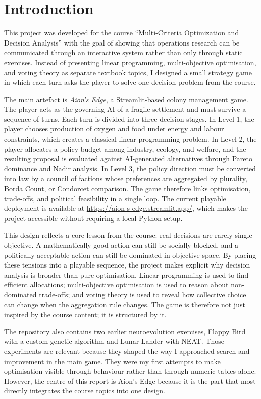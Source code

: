 \section{Introduction}

This project was developed for the course ``Multi-Criteria Optimization
and Decision Analysis'' with the goal of showing that operations
research can be communicated through an interactive system rather than
only through static exercises. Instead of presenting linear programming,
multi-objective optimisation, and voting theory as separate textbook
topics, I designed a small strategy game in which each turn asks the
player to solve one decision problem from the course.

The main artefact is \emph{Aion's Edge}, a Streamlit-based colony
management game. The player acts as the governing AI of a fragile
settlement and must survive a sequence of turns. Each turn is divided
into three decision stages. In Level 1, the player chooses production of
oxygen and food under energy and labour constraints, which creates a
classical linear-programming problem. In Level 2, the player allocates a
policy budget among industry, ecology, and welfare, and the resulting
proposal is evaluated against AI-generated alternatives through Pareto
dominance and Nadir analysis. In Level 3, the policy direction must be
converted into law by a council of factions whose preferences are
aggregated by plurality, Borda Count, or Condorcet comparison. The game
therefore links optimisation, trade-offs, and political feasibility in a
single loop. The current playable deployment is available at
\url{https://aion-s-edge.streamlit.app/}, which makes the project
accessible without requiring a local Python setup.

This design reflects a core lesson from the course: real decisions are
rarely single-objective. A mathematically good action can still be
socially blocked, and a politically acceptable action can still be
dominated in objective space. By placing these tensions into a playable
sequence, the project makes explicit why decision analysis is broader
than pure optimisation. Linear programming is used to find efficient
allocations; multi-objective optimisation is used to
reason about non-dominated trade-offs; and voting
theory is used to reveal how collective choice can change when the
aggregation rule changes. The game is therefore not
just inspired by the course content; it is structured by it.

The repository also contains two earlier neuroevolution exercises,
Flappy Bird with a custom genetic algorithm and Lunar Lander with NEAT.
Those experiments are relevant because they shaped the way I approached
search and improvement in the main game. They were my first attempts to
make optimisation visible through behaviour rather than through numeric
tables alone. However, the centre of this report is Aion's Edge because
it is the part that most directly integrates the course topics into one
design.

